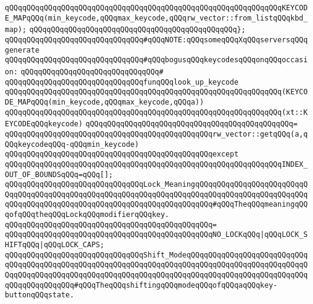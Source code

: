 \newline
\verb|qQQqqQQqqQQqqQQqqQQqqQQqqQQqqQQqqQQqqQQqqQQqqQQqqQQqqQQqqQQqqQQqKEYCODE_MAPqQQq(min_keycode,qQQqmax_keycode,qQQqrw_vector::from_listqQQqkbd_map);|\newline
\verb|qQQqqQQqqQQqqQQqqQQqqQQqqQQqqQQqqQQqqQQqqQQqqQQq};|\newline
\newline
\verb|qQQqqQQqqQQqqQQqqQQqqQQqqQQqqQQq#qQQqNOTE:qQQqsomeqQQqXqQQqserversqQQqgenerate|\newline
\verb|qQQqqQQqqQQqqQQqqQQqqQQqqQQqqQQq#qQQqbogusqQQqkeycodesqQQqonqQQqoccasion:|\newline
\verb|qQQqqQQqqQQqqQQqqQQqqQQqqQQqqQQq#|\newline
\verb|qQQqqQQqqQQqqQQqqQQqqQQqqQQqqQQqfunqQQqlook_up_keycode|\newline
\verb|qQQqqQQqqQQqqQQqqQQqqQQqqQQqqQQqqQQqqQQqqQQqqQQqqQQqqQQqqQQqqQQq(KEYCODE_MAPqQQq(min_keycode,qQQqmax_keycode,qQQqa))|\newline
\verb|qQQqqQQqqQQqqQQqqQQqqQQqqQQqqQQqqQQqqQQqqQQqqQQqqQQqqQQqqQQqqQQq(xt::KEYCODEqQQqkeycode)|\newline
\verb|qQQqqQQqqQQqqQQqqQQqqQQqqQQqqQQqqQQqqQQqqQQqqQQq=|\newline
\verb|qQQqqQQqqQQqqQQqqQQqqQQqqQQqqQQqqQQqqQQqqQQqqQQqrw_vector::getqQQq(a,qQQqkeycodeqQQq-qQQqmin_keycode)|\newline
\verb|qQQqqQQqqQQqqQQqqQQqqQQqqQQqqQQqqQQqqQQqqQQqqQQqexcept|\newline
\verb|qQQqqQQqqQQqqQQqqQQqqQQqqQQqqQQqqQQqqQQqqQQqqQQqqQQqqQQqqQQqqQQqINDEX_OUT_OF_BOUNDSqQQq=qQQq[];|\newline
\newline
\newline
\verb|qQQqqQQqqQQqqQQqqQQqqQQqqQQqqQQqLock_MeaningqQQqqQQqqQQqqQQqqQQqqQQqqQQqqQQqqQQqqQQqqQQqqQQqqQQqqQQqqQQqqQQqqQQqqQQqqQQqqQQqqQQqqQQqqQQqqQQqqQQqqQQqqQQqqQQqqQQqqQQqqQQqqQQqqQQqqQQqqQQqqQQq#qQQqTheqQQqmeaningqQQqofqQQqtheqQQqLockqQQqmodifierqQQqkey.|\newline
\verb|qQQqqQQqqQQqqQQqqQQqqQQqqQQqqQQqqQQqqQQqqQQqqQQq=|\newline
\verb|qQQqqQQqqQQqqQQqqQQqqQQqqQQqqQQqqQQqqQQqqQQqqQQqNO_LOCKqQQq|\verb#|qQQqLOCK_SHIFTqQQq|qQQqLOCK_CAPS;#\newline
\newline
\newline
\verb|qQQqqQQqqQQqqQQqqQQqqQQqqQQqqQQqShift_ModeqQQqqQQqqQQqqQQqqQQqqQQqqQQqqQQqqQQqqQQqqQQqqQQqqQQqqQQqqQQqqQQqqQQqqQQqqQQqqQQqqQQqqQQqqQQqqQQqqQQqqQQqqQQqqQQqqQQqqQQqqQQqqQQqqQQqqQQqqQQqqQQqqQQqqQQqqQQqqQQqqQQqqQQqqQQqqQQqqQQqqQQq#qQQqTheqQQqshiftingqQQqmodeqQQqofqQQqaqQQqkey-buttonqQQqstate.|\newline
